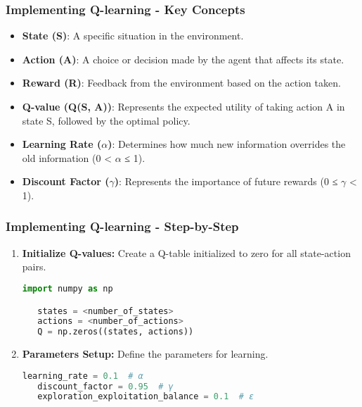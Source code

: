 \documentclass[aspectratio=169]{beamer}
\begin{document}
\begin{frame}
    \frametitle{Implementing Q-learning - Key Concepts}
    \begin{itemize}
        \item \textbf{State (S)}: A specific situation in the environment.
        \item \textbf{Action (A)}: A choice or decision made by the agent that affects its state.
        \item \textbf{Reward (R)}: Feedback from the environment based on the action taken.
        \item \textbf{Q-value (Q(S, A))}: Represents the expected utility of taking action A in state S, followed by the optimal policy.
        \item \textbf{Learning Rate ($\alpha$)}: Determines how much new information overrides the old information (0 < $\alpha$ ≤ 1).
        \item \textbf{Discount Factor ($\gamma$)}: Represents the importance of future rewards (0 ≤ $\gamma$ < 1).
    \end{itemize}
\end{frame}

\begin{frame}[fragile]
    \frametitle{Implementing Q-learning - Step-by-Step}
    \begin{enumerate}
        \item \textbf{Initialize Q-values:} Create a Q-table initialized to zero for all state-action pairs.
        \begin{lstlisting}[language=Python]
   import numpy as np

   states = <number_of_states>
   actions = <number_of_actions>
   Q = np.zeros((states, actions))
        \end{lstlisting}
        
        \item \textbf{Parameters Setup:} Define the parameters for learning.
        \begin{lstlisting}[language=Python]
   learning_rate = 0.1  # α
   discount_factor = 0.95  # γ
   exploration_exploitation_balance = 0.1  # ε
        \end{lstlisting}

    \end{enumerate}
\end{frame}
\end{document}
